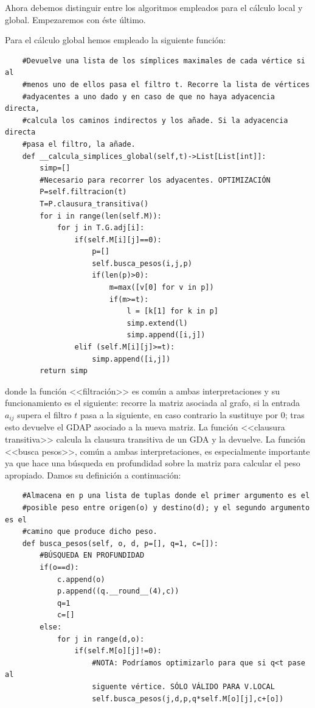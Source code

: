 \documentclass[12pt, a4paper, twoside]{book}
\numberwithin{equation}{section}
\theoremstyle{definition}
\theoremstyle{remark}
\theoremstyle{plain}
\begin{document}
	Ahora debemos distinguir entre los algoritmos empleados para el 
	cálculo local y global. Empezaremos con éste último.

	Para el cálculo global hemos empleado la siguiente función:

	\begin{verbatim}
	#Devuelve una lista de los símplices maximales de cada vértice si al 
	#menos uno de ellos pasa el filtro t. Recorre la lista de vértices 
	#adyacentes a uno dado y en caso de que no haya adyacencia directa, 
	#calcula los caminos indirectos y los añade. Si la adyacencia directa 
	#pasa el filtro, la añade.
	def __calcula_simplices_global(self,t)->List[List[int]]:
        simp=[]
        #Necesario para recorrer los adyacentes. OPTIMIZACIÓN
        P=self.filtracion(t)
        T=P.clausura_transitiva()
        for i in range(len(self.M)):
            for j in T.G.adj[i]:
                if(self.M[i][j]==0):
                    p=[]
                    self.busca_pesos(i,j,p)
                    if(len(p)>0):
                        m=max([v[0] for v in p])
                        if(m>=t):
                            l = [k[1] for k in p]
                            simp.extend(l)
                            simp.append([i,j])
                elif (self.M[i][j]>=t):
                    simp.append([i,j])
        return simp
	\end{verbatim}

	\noindent donde la función <<filtración>> es común a ambas 
	interpretaciones y su funcionamiento es el siguiente: recorre la 
	matriz asociada al grafo, si la entrada $a_{ij}$ supera el filtro $t$ 
	pasa a la siguiente, en caso contrario la sustituye por 0; tras esto 
	devuelve el GDAP asociado a la nueva matriz. La función 
	<<clausura transitiva>> calcula la clausura transitiva de un GDA y 
	la devuelve. La función <<busca pesos>>, común a ambas 
	interpretaciones, es especialmente importante ya 
	que hace una búsqueda en profundidad sobre la matriz para calcular el
	peso apropiado. Damos su definición a continuación:

	\begin{verbatim}
	#Almacena en p una lista de tuplas donde el primer argumento es el 
	#posible peso entre origen(o) y destino(d); y el segundo argumento es el 
	#camino que produce dicho peso. 
	def busca_pesos(self, o, d, p=[], q=1, c=[]):
        #BÚSQUEDA EN PROFUNDIDAD
        if(o==d):
            c.append(o)
            p.append((q.__round__(4),c))
            q=1
            c=[]
        else:   
            for j in range(d,o):
                if(self.M[o][j]!=0):
                    #NOTA: Podríamos optimizarlo para que si q<t pase al 
                    siguente vértice. SÓLO VÁLIDO PARA V.LOCAL
                    self.busca_pesos(j,d,p,q*self.M[o][j],c+[o])
	\end{verbatim}
\end{document}
